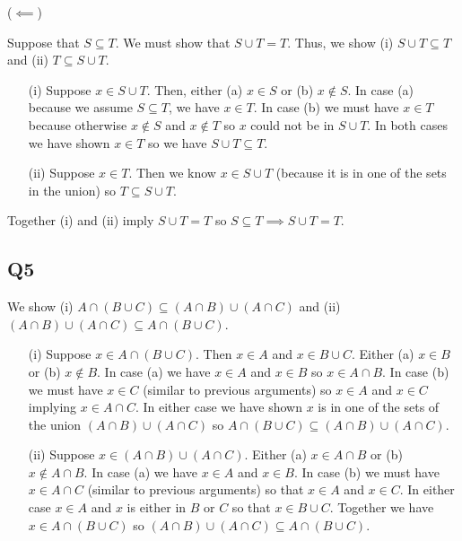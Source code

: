 \documentclass[12pt]{article}
\numberwithin{theorem}{section}
\numberwithin{equation}{section}
\numberwithin{remark}{section}
\numberwithin{definition}{section}
\numberwithin{theorem}{section}
\numberwithin{lemma}{section}
\numberwithin{example}{section}
\begin{document}
\noindent ($\impliedby$)

Suppose that $S \subseteq T$. We must show that $S \cup T = T$. Thus, we show (i) $S \cup T \subseteq T$ and (ii) $T \subseteq S \cup T$.
\begin{itemize}
	\item[(i)]{Suppose $x\in S \cup T$. Then, either (a) $x\in S$ or (b) $x\notin S$. In case (a) because we assume $S \subseteq T$, we have $x \in T$. In case (b) we must have $x \in T$ because otherwise $x\notin S$ and $x\notin T$ so $x$ could not be in $S \cup T$. In both cases we have shown $x\in T$ so we have $S \cup T \subseteq T$.}
	\item[(ii)]{Suppose $x \in T$. Then we know $x \in S \cup T$ (because it is in one of the sets in the union) so $T \subseteq S \cup T$.}
\end{itemize}
Together (i) and (ii) imply $S \cup T = T$ so $S \subseteq T \implies S \cup T = T$.



\subsection{Q5}

We show (i) $A \cap \left(B \cup C\right) \subseteq \left(A \cap B\right) \cup  \left(A \cap C\right)$ and (ii) $\left(A \cap B\right) \cup  \left(A \cap C\right) \subseteq A \cap \left(B \cup C\right)$.
\begin{itemize}
	\item[(i)]{Suppose $x\in A \cap \left(B \cup C\right)$. Then $x\in A$ and $x \in B \cup C$. Either (a) $x\in B$ or (b) $x\notin B$. In case (a) we have $x\in A$ and $x\in B$ so $x\in A \cap B$. In case (b) we must have $x\in C$ (similar to previous arguments) so $x\in A$ and $x \in C$ implying $x \in A \cap C$. In either case we have shown $x$ is in one of the sets of the union $\left(A \cap B\right) \cup  \left(A \cap C\right)$ so $A \cap \left(B \cup C\right) \subseteq \left(A \cap B\right) \cup  \left(A \cap C\right)$.}
	\item[(ii)]{Suppose $x \in \left(A \cap B\right) \cup  \left(A \cap C\right)$. Either (a) $x \in A \cap B$ or (b) $x \notin A \cap B$. In case (a) we have $x\in A$ and $x\in B$. In case (b) we must have $x \in A \cap C$ (similar to previous arguments) so that $x\in A$ and $x\in C$. In either case $x\in A$ and $x$ is either in $B$ or $C$ so that $x\in B \cup C$. Together we have $x\in A \cap \left(B \cup C\right)$ so $\left(A \cap B\right) \cup  \left(A \cap C\right) \subseteq A \cap \left(B \cup C\right)$.}
\end{itemize}
\end{document}
